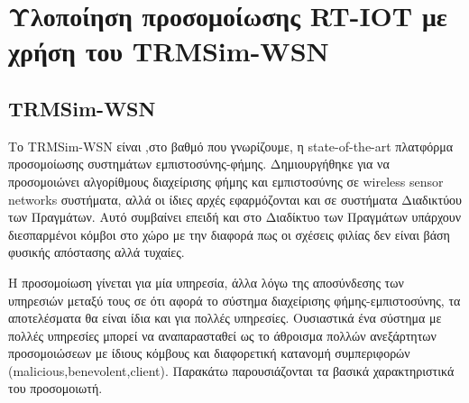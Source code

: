 \chapter{Υλοποίηση προσομοίωσης RT-IOT με χρήση του TRMSim-WSN}\label{ch:implementation}

\section{TRMSim-WSN}


Το TRMSim-WSN %
 είναι ,στο βαθμό που γνωρίζουμε, η state-of-the-art πλατφόρμα προσομοίωσης συστημάτων εμπιστοσύνης-φήμης. Δημιουργήθηκε για να προσομοιώνει αλγορίθμους διαχείρισης φήμης και εμπιστοσύνης σε wireless sensor networks συστήματα, αλλά οι ίδιες αρχές εφαρμόζονται και σε συστήματα Διαδικτύου των Πραγμάτων.
 Αυτό συμβαίνει επειδή και στο Διαδίκτυο των Πραγμάτων υπάρχουν διεσπαρμένοι κόμβοι στο χώρο με την διαφορά πως οι σχέσεις φιλίας δεν είναι βάση φυσικής απόστασης αλλά τυχαίες. 
 
 Η προσομοίωση γίνεται για μία υπηρεσία, άλλα λόγω της αποσύνδεσης των υπηρεσιών μεταξύ τους σε ότι αφορά το σύστημα διαχείρισης φήμης-εμπιστοσύνης, τα αποτελέσματα θα είναι ίδια και για πολλές υπηρεσίες. Ουσιαστικά ένα σύστημα με πολλές υπηρεσίες μπορεί να αναπαρασταθεί ως το άθροισμα πολλών ανεξάρτητων προσομοιώσεων με ίδιους κόμβους και διαφορετική κατανομή συμπεριφορών (malicious,benevolent,client). Παρακάτω παρουσιάζονται τα βασικά χαρακτηριστικά του προσομοιωτή.
 \newpage
 
 
 
